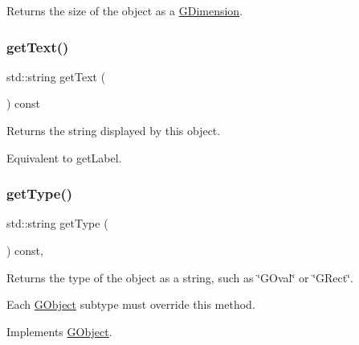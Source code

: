 Returns the size of the object as a {\ttfamily \mbox{\hyperlink{structsgl_1_1GDimension}{G\+Dimension}}}. 

\mbox{\label{classsgl_1_1GText_aff553c50924b836c29f146ed34a7c6ec}} 
\subsubsection{\texorpdfstring{get\+Text()}{getText()}}
{\footnotesize\ttfamily std\+::string get\+Text (\begin{DoxyParamCaption}{ }\end{DoxyParamCaption}) const\hspace{0.3cm}{\ttfamily [virtual]}}



Returns the string displayed by this object. 

Equivalent to get\+Label. \mbox{\label{classsgl_1_1GText_a9b72ede4ee8520f987a0c01e30654814}} 
\subsubsection{\texorpdfstring{get\+Type()}{getType()}}
{\footnotesize\ttfamily std\+::string get\+Type (\begin{DoxyParamCaption}{ }\end{DoxyParamCaption}) const\hspace{0.3cm}{\ttfamily [override]}, {\ttfamily [virtual]}}



Returns the type of the object as a string, such as {\ttfamily \char`\"{}\+G\+Oval\char`\"{}} or {\ttfamily \char`\"{}\+G\+Rect\char`\"{}}. 

Each \mbox{\hyperlink{classsgl_1_1GObject}{G\+Object}} subtype must override this method. 

Implements \mbox{\hyperlink{classsgl_1_1GObject_a799e073a127b428cc841086d42ea4fed}{G\+Object}}.

\mbox{\label{classsgl_1_1GObject_a0ed2965abd4f5701d2cadf71239faf19}} 
